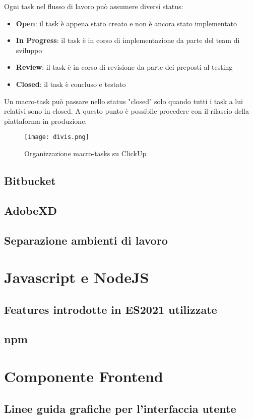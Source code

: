 Ogni task nel flusso di lavoro può assumere diversi status:
\begin{itemize}
    \item \textbf{Open}: il task è appena stato creato e non è ancora stato implementato
    \item \textbf{In Progress}: il task è in corso di implementazione da parte del team di sviluppo
    \item \textbf{Review}: il task è in corso di revisione da parte dei preposti al testing
    \item \textbf{Closed}: il task è concluso e testato
\end{itemize} 
Un macro-task può passare nello status "closed" solo quando tutti i task a lui relativi sono in closed. A questo punto è possibile procedere con il rilascio della piattaforma in produzione.
\begin{figure}[!htb]
    \centering
    \texttt{[image: divis.png]}
    \caption{Organizzazione macro-tasks su ClickUp}
\end{figure}
\subsection{Bitbucket}
\subsection{AdobeXD}
\subsection{Separazione ambienti di lavoro}

\section{Javascript e NodeJS}
\subsection{Features introdotte in ES2021 utilizzate}
\subsection{npm}
\newpage
\section{Componente Frontend}
\subsection{Linee guida grafiche per l'interfaccia utente}
